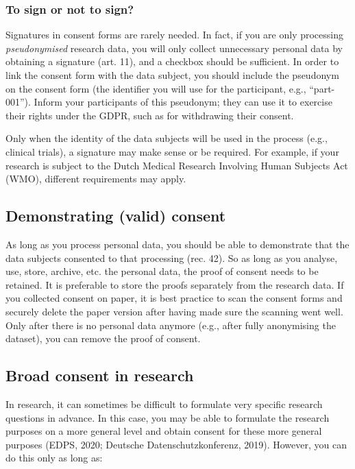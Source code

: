 \documentclass[
]{book}
\begin{document}
\hypertarget{to-sign-or-not-to-sign}{%
\subsubsection{To sign or not to sign?}\label{to-sign-or-not-to-sign}}

Signatures in consent forms are rarely needed. In fact, if you are only
processing \emph{pseudonymised} research data, you will only collect unnecessary
personal data by obtaining a signature
(art. 11), and a
checkbox should be sufficient. In order to link the consent form with the data
subject, you should include the pseudonym on the consent form (the identifier
you will use for the participant, e.g., ``part-001''). Inform your participants
of this pseudonym; they can use it to exercise their rights under the GDPR,
such as for withdrawing their consent.

Only when the identity of the data subjects will be used in the process (e.g.,
clinical trials), a signature may make sense or be required. For example, if
your research is subject
to the Dutch Medical Research Involving Human Subjects Act (WMO),
different requirements may apply.

\hypertarget{demonstrate-consent}{%
\subsection{Demonstrating (valid) consent}\label{demonstrate-consent}}

As long as you process personal data, you should be able to demonstrate that the
data subjects consented to that processing
(rec. 42).
So as long as you analyse, use, store, archive, etc. the personal data, the
proof of consent needs to be retained. It is preferable to store the proofs
separately from the research data. If you collected consent on paper, it is
best practice to scan the consent forms and securely delete the paper version
after having made sure the scanning went well. Only after there is no personal
data anymore (e.g., after fully anonymising the dataset), you can remove the
proof of consent.

\hypertarget{broad-consent}{%
\subsection{Broad consent in research}\label{broad-consent}}

In research, it can sometimes be difficult to formulate very specific research
questions in advance. In this case, you may be able to formulate the research
purposes on a more general level and obtain consent for these more general
purposes
(EDPS, 2020;
Deutsche Datenschutzkonferenz, 2019).
However, you can do this only as long as:
\end{document}
